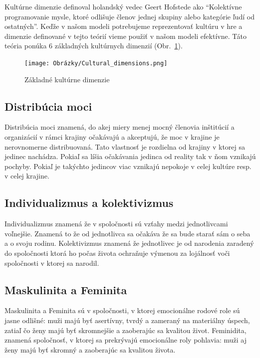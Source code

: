 \documentclass[10pt,twoside,slovak,a4paper]{article}
\begin{document}
Kultúrne dimenzie definoval holandský vedec Geert Hofstede ako \cite{hofstede2010cultures}
``Kolektívne programovanie mysle, ktoré odlišuje členov jednej skupiny alebo kategórie ľudí
od ostatných''. Keďže v našom modeli potrebujeme reprezentovať kultúru v hre a dimenzie definované
v tejto teórií vieme použiť v našom modeli efektívne. Táto teória \cite{hall1966the} ponúka 6
základných kultúrnych dimenzií (Obr.~\ref{fig:culture}).

\begin{figure}[H]
	\centering
	\texttt{[image: Obrázky/Cultural\_dimensions.png]}
	\caption{Základné kultúrne dimenzie~\cite{hofstede2010cultures}}
	\label{fig:culture}
\end{figure}

\subsection{Distribúcia moci}\label{kultura:moc}

Distribúcia moci znamená, do akej miery menej mocný členovia inštitúcií a organizácií v
rámci krajiny očakávajú a akceptujú, že moc v krajine je nerovnomerne distribuovaná. Tato
vlastnosť je rozdielna od krajiny v ktorej sa jedinec nachádza. Pokiaľ sa líšia očakávania
jedinca od reality tak v ňom vznikajú pochyby. Pokiaľ je takýchto jedincov viac vznikajú
nepokoje v celej kultúre resp. v celej krajine.

\subsection{Individualizmus a kolektivizmus}\label{kultura:etika}

Individualizmus znamená že v spoločnosti sú vzťahy medzi jednotlivcami voľnejšie. Znamená
to že od jednotlivca sa očakáva že sa bude starať sám o seba a o svoju rodinu. Kolektivizmus
znamená že jednotlivec je od narodenia zaradený do spoločnosti ktorá ho počas života ochraňuje
výmenou za lojálnosť voči spoločnosti v ktorej sa narodil.

\subsection{Maskulinita a Feminita}\label{kultura:masfem}

Maskulinita a Feminita sú v spoločnosti, v ktorej emocionálne rodové role sú jasne odlišné: 
muži majú byť asertívny, tvrdý a zameraný na materiálny úspech, zatiaľ čo ženy majú
byť skromnejšie a zaoberajúc sa kvalitou život. Feminidita, znamená spoločnosť, v ktorej
sa prekrývajú emocionálne roly pohlavia: muži aj ženy majú byť skromný a zaoberajúc
sa kvalitou života.
\end{document}
